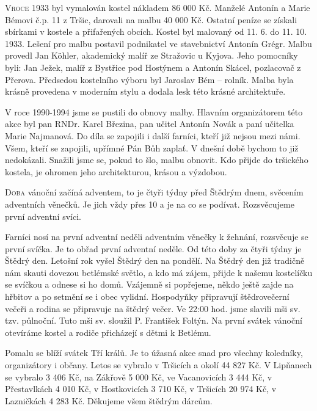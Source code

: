 \documentclass[10pt]{article}
\begin{document}
\begin{multicols}{3}{

\lettrine{V}{roce} 1933 byl vymalován kostel nákladem 86 000 Kč. Manželé Antonín a Marie Bémovi č.p. 11 z Tršic, darovali na malbu 40 000 Kč. Ostatní peníze se získali sbírkami v kostele a přifařených obcích. Kostel byl malovaný od 11. 6. do 11. 10. 1933. Lešení pro malbu postavil podnikatel ve stavebnictví Antonín Grégr. Malbu provedl Jan Köhler, akademický malíř ze Stražovic u Kyjova. Jeho pomocníky byli: Jan Ježek, malíř z Bystřice pod Hostýnem a Antonín Skácel, pozlacovač z Přerova. Předsedou kostelního výboru byl Jaroslav Bém – rolník. Malba byla krásně provedena v moderním stylu a dodala lesk této krásné architektuře.

V roce 1990-1994 jsme se pustili do obnovy malby. Hlavním organizátorem této akce byl pan RNDr. Karel Březina, pan učitel Antonín Novák a paní učitelka Marie Najmanová. Do díla se zapojili i další farníci, kteří již nejsou mezi námi. 
Všem, kteří se zapojili, upřímné Pán Bůh zaplať. V dnešní době bychom to již nedokázali.
Snažili jsme se, pokud to šlo, malbu obnovit. Kdo přijde do tršického kostela, je ohromen jeho architekturou, krásou a výzdobou.
\closearticle


\lettrine{D}{oba} vánoční začíná adventem, to je čtyři týdny před Štědrým dnem, svěcením adventních věnečků. Je jich vždy přes 10 a je na co se podívat.  Rozsvěcujeme první adventní svíci.

Farníci nosí na první adventní neděli adventním věnečky k žehnání, rozsvěcuje se první svíčka. Je to obřad první adventní neděle. Od této doby za čtyři týdny je Štědrý den. Letošní rok vyšel Štědrý den na pondělí. Na Štědrý den již tradičně nám skauti dovezou betlémské světlo, a kdo má zájem, přijde k našemu kostelíčku se svíčkou a odnese si ho domů. Vzájemně si popřejeme, někdo ještě zajde na hřbitov a po setmění se i obec vylidní. Hospodyňky připravují štědrovečerní večeři a rodina se připravuje na štědrý večer. Ve 22:00 hod. jsme slavili mši sv. tzv. půlnoční. Tuto mši sv. sloužil P. František Foltýn. Na první svátek vánoční otevíráme kostel a rodiče přicházejí s dětmi k Betlému.

Pomalu se blíží svátek Tří králů. Je to úžasná akce snad pro všechny koledníky, organizátory i občany. Letos se vybralo v Tršicích a okolí 44 827 Kč. V Lipňanech se vybralo 3 406 Kč, na Zákřově 5 000 Kč, ve Vacanovicích 3 444 Kč, v Přestavlkách 4 010 Kč, v Hostkovicích 3 710 Kč, v Tršicích 20 974 Kč, v Lazničkách 4 283 Kč. Děkujeme všem štědrým dárcům.
}\end{multicols}

\thispagestyle{myinfo}
\end{document}
